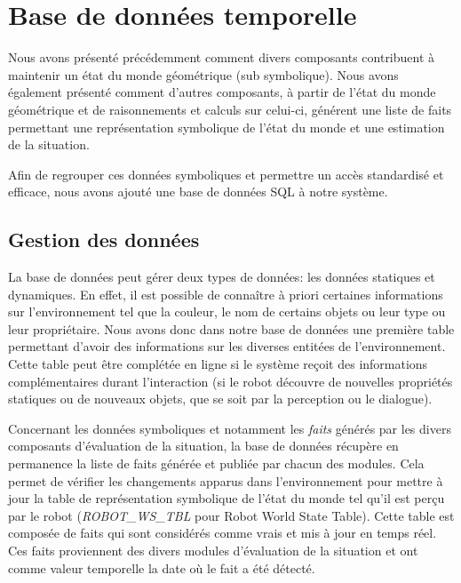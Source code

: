\documentclass[a4paper,11pt,twoside]{StyleThese}
\begin{document}
\section{Base de données temporelle}
\label{sec:db}
Nous avons présenté précédemment comment divers composants contribuent à maintenir un état du monde géométrique (sub symbolique). Nous avons également présenté comment d'autres composants, à partir de l'état du monde géométrique et de raisonnements et calculs sur celui-ci, générent une liste de faits permettant une représentation symbolique de l'état du monde et une estimation de la situation.

Afin de regrouper ces données symboliques et permettre un accès standardisé et efficace, nous avons ajouté une base de données SQL à notre système.

\subsection{Gestion des données}
\label{sec:dbd}
La base de données peut gérer deux types de données: les données statiques et dynamiques. En effet, il est possible de connaître à priori certaines informations sur l'environnement tel que la couleur, le nom de certains objets ou leur type ou leur propriétaire. 
Nous avons donc dans notre base de données une première table permettant d'avoir des informations sur les diverses entitées de l'environnement. Cette table peut être complétée en ligne si le système reçoit des informations complémentaires durant l'interaction (si le robot découvre de nouvelles propriétés statiques ou de nouveaux objets, que se soit par la perception ou le dialogue).

Concernant les données symboliques et notamment les \textit{faits} générés par les divers composants d'évaluation de la situation, la base de données récupère en permanence la liste de faits générée et publiée par chacun des modules. Cela permet de vérifier les changements apparus dans l'environnement pour mettre à jour la table de représentation symbolique de l'état du monde tel qu'il est perçu par le robot (\textit{ROBOT\_WS\_TBL} pour Robot World State Table).
Cette table est composée de faits qui sont considérés comme vrais et mis à jour en temps réel. Ces faits proviennent des divers modules d'évaluation de la situation et ont comme valeur temporelle la date où le fait a été détecté.

\end{document}
